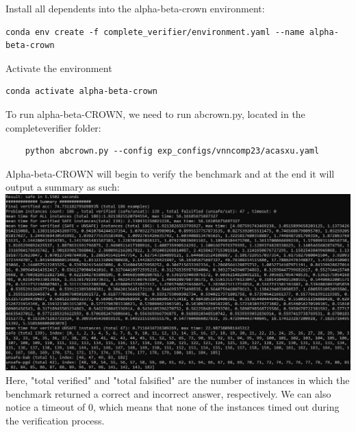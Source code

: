 \documentclass{article}
\begin{document}
Install all dependents into the alpha-beta-crown environment:
\begin{verbatim}conda env create -f complete_verifier/environment.yaml --name alpha-beta-crown\end{verbatim}

Activate the environment
\begin{verbatim}conda activate alpha-beta-crown\end{verbatim}
To run alpha-beta-CROWN, we need to run abcrown.py, located in the complete\textunderscore verifier folder:
\begin{verbatim}
    python abcrown.py --config exp_configs/vnncomp23/acasxu.yaml
\end{verbatim}
Alpha-beta-CROWN will begin to verify the benchmark and at the end it will output a summary as such:\newline
\includegraphics[scale=0.6]{alphabeta.jpg}
\newline
Here, "total verified" and "total falsified" are the number of instances in which the benchmark returned a correct and incorrect answer, respectively. We can also notice a timeout of 0, which means that none of the instances timed out during the verification process.
\end{document}
